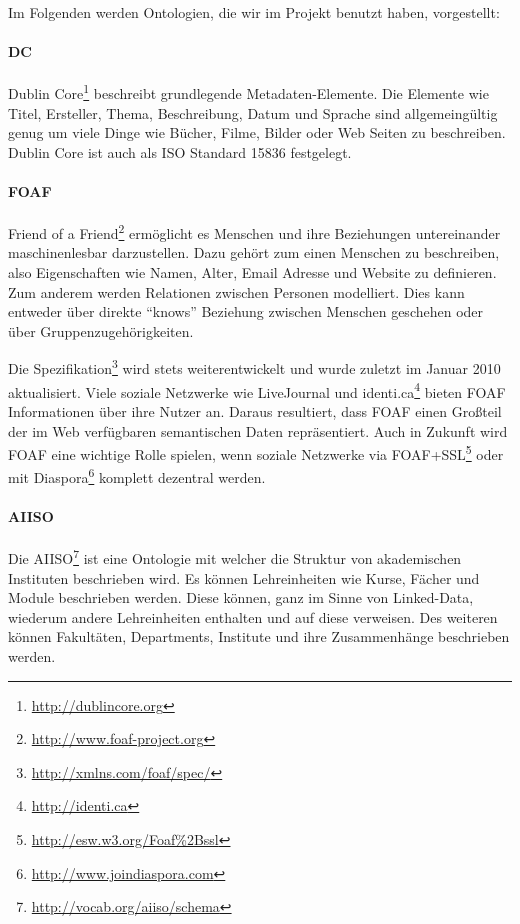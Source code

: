 Im Folgenden werden Ontologien, die wir im Projekt benutzt haben, vorgestellt:

\paragraph{DC}
Dublin Core\footnote{\url{http://dublincore.org}} beschreibt grundlegende Metadaten-Elemente. Die Elemente wie Titel, Ersteller, Thema, Beschreibung, Datum und Sprache sind allgemeingültig genug um viele Dinge wie Bücher, Filme, Bilder oder Web Seiten zu beschreiben.
Dublin Core ist auch als ISO Standard 15836 festgelegt.

\paragraph{FOAF}
\label{foaf}
Friend of a Friend\footnote{\url{http://www.foaf-project.org}} ermöglicht es Menschen und ihre Beziehungen untereinander maschinenlesbar darzustellen.
Dazu gehört zum einen Menschen zu beschreiben, also Eigenschaften wie Namen, Alter, Email Adresse und Website zu definieren.
Zum anderem werden Relationen zwischen Personen modelliert. Dies kann entweder über direkte ``knows'' Beziehung zwischen Menschen geschehen oder über Gruppenzugehörigkeiten.

Die Spezifikation\footnote{\url{http://xmlns.com/foaf/spec/}} wird stets weiterentwickelt und wurde zuletzt im Januar 2010 aktualisiert.
Viele soziale Netzwerke wie LiveJournal und identi.ca\footnote{\url{http://identi.ca}} bieten FOAF Informationen über ihre Nutzer an.
Daraus resultiert, dass FOAF einen Großteil der im Web verfügbaren semantischen Daten repräsentiert.
Auch in Zukunft wird FOAF eine wichtige Rolle spielen, wenn soziale Netzwerke via FOAF+SSL\footnote{\url{http://esw.w3.org/Foaf\%2Bssl}} oder mit Diaspora\footnote{\url{http://www.joindiaspora.com}} komplett dezentral werden.

\paragraph{AIISO}
Die \gls{AIISO}\footnote{\url{http://vocab.org/aiiso/schema}} ist eine Ontologie mit welcher die Struktur von akademischen Instituten beschrieben wird.
Es können Lehreinheiten wie Kurse, Fächer und Module beschrieben werden. Diese können, ganz im Sinne von Linked-Data, wiederum andere Lehreinheiten enthalten und auf diese verweisen.
Des weiteren können Fakultäten, Departments, Institute und ihre Zusammenhänge beschrieben werden.

